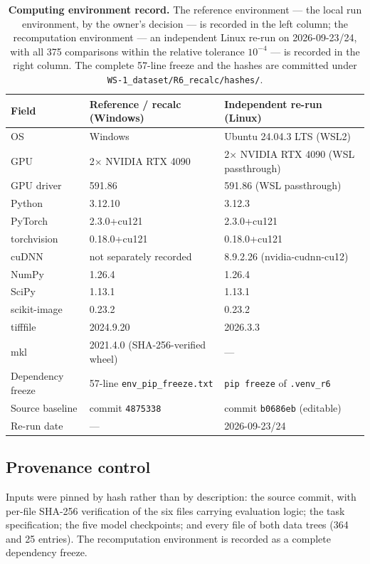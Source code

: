 \documentclass[11pt]{article}
\begin{document}
\begin{table}[ht]
\centering
\begin{tabular}{@{}lll@{}}
\toprule
Field & Reference / recalc (Windows) & Independent re-run (Linux) \\
\midrule
OS & Windows & Ubuntu 24.04.3 LTS (WSL2) \\
GPU & 2$\times$ NVIDIA RTX 4090 & 2$\times$ NVIDIA RTX 4090 (WSL passthrough) \\
GPU driver & 591.86 & 591.86 (WSL passthrough) \\
Python & 3.12.10 & 3.12.3 \\
PyTorch & 2.3.0+cu121 & 2.3.0+cu121 \\
torchvision & 0.18.0+cu121 & 0.18.0+cu121 \\
cuDNN & not separately recorded & 8.9.2.26 (nvidia-cudnn-cu12) \\
NumPy & 1.26.4 & 1.26.4 \\
SciPy & 1.13.1 & 1.13.1 \\
scikit-image & 0.23.2 & 0.23.2 \\
tifffile & 2024.9.20 & 2026.3.3 \\
mkl & 2021.4.0 (SHA-256-verified wheel) & --- \\
Dependency freeze & 57-line \texttt{env\_pip\_freeze.txt} & \texttt{pip freeze} of \texttt{.venv\_r6} \\
Source baseline & commit \texttt{4875338} & commit \texttt{b0686eb} (editable) \\
Re-run date & --- & 2026-09-23/24 \\
\bottomrule
\end{tabular}
\caption{\textbf{Computing environment record.} The reference environment --- the local run
environment, by the owner's decision --- is recorded in the left column; the recomputation
environment --- an independent Linux re-run on 2026-09-23/24, with all 375 comparisons within the
relative tolerance $10^{-4}$ --- is recorded in the right column. The complete 57-line freeze and
the hashes are committed under \texttt{WS-1\_dataset/R6\_recalc/hashes/}.}
\label{tab:env}
\end{table}

\subsection{Provenance control}

Inputs were pinned by hash rather than by description: the source commit, with per-file SHA-256
verification of the six files carrying evaluation logic; the task specification; the five model
checkpoints; and every file of both data trees (364 and 25 entries). The recomputation environment
is recorded as a complete dependency freeze.
\end{document}
